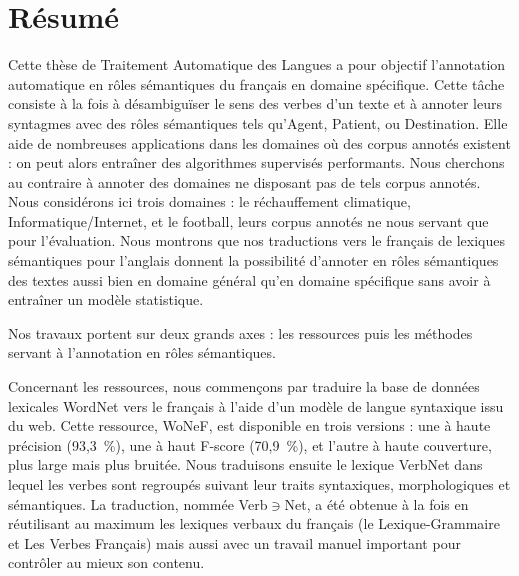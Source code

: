 \documentclass[oneside,parskip]{scrbook}
\date{\Large
    \begin{minipage}[t]{0.61\linewidth}
    \begin{center}\textbf{Thèse sous la direction de :}\end{center}
    Laurence \textsc{Danlos} et Gaël \textsc{de Chalendar}
    \begin{center}~\end{center}
    \begin{center}~\end{center}
    \end{minipage}
}
\title{}
\newcommand{\verbenet}{Verb$\ni$Net}
\begin{document}
\maketitle

\frontmatter



\chapter{Résumé}

Cette thèse de Traitement Automatique des Langues a pour objectif l'annotation
automatique en rôles sémantiques du français en domaine spécifique. Cette tâche
consiste à la fois à désambiguïser le sens des verbes d'un texte et à annoter
leurs syntagmes avec des rôles sémantiques tels qu'Agent, Patient, ou
Destination. Elle aide de nombreuses applications dans les domaines où des
corpus annotés existent : on peut alors entraîner des algorithmes supervisés
performants. Nous cherchons au contraire à annoter des domaines ne disposant
pas de tels corpus annotés. Nous considérons ici trois domaines : le
réchauffement climatique, Informatique/Internet, et le football, leurs corpus
annotés ne nous servant que pour l'évaluation. Nous montrons que nos
traductions vers le français de lexiques sémantiques pour l'anglais donnent la
possibilité d'annoter en rôles sémantiques des textes aussi bien en domaine
général qu'en domaine spécifique sans avoir à entraîner un modèle statistique.

Nos travaux portent sur deux grands axes : les ressources puis les méthodes servant à
l'annotation en rôles sémantiques.

Concernant les ressources, nous commençons par traduire la base de données
lexicales WordNet vers le français à l'aide d'un modèle de langue syntaxique
issu du web.  Cette ressource, WoNeF, est disponible en trois versions : une à
haute précision (93,3~\%), une à haut F-score (70,9~\%), et l'autre à haute
couverture, plus large mais plus bruitée. Nous traduisons ensuite le lexique
VerbNet dans lequel les verbes sont regroupés suivant leur traits syntaxiques,
morphologiques et sémantiques. La traduction, nommée \verbenet{}, a été obtenue
à la fois en réutilisant au maximum les lexiques verbaux du français (le
Lexique-Grammaire et Les Verbes Français) mais aussi avec un travail manuel
important pour contrôler au mieux son contenu.
\end{document}
